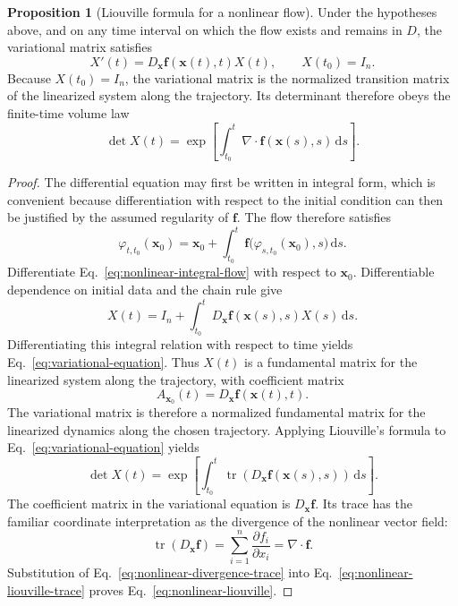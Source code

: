\documentclass[11pt,a4paper]{article}
\newcommand{\be}{\begin{equation}}
\newcommand{\ee}{\end{equation}}
\newcommand{\lb}[1]{\label{#1}}
\newcommand{\dd}{\mathrm{d}}
\DeclareMathOperator{\tr}{tr}
\theoremstyle{definition}
\newtheorem{proposition}{Proposition}[section]
\numberwithin{equation}{section}
\begin{document}
\begin{proposition}[Liouville formula for a nonlinear flow]
Under the hypotheses above, and on any time interval on which the flow exists and remains in $D$, the variational matrix satisfies
\be
X'(t)=D_{\mathbf x}\mathbf f(\mathbf x(t),t)X(t),
\qquad
X(t_0)=I_n.
\lb{eq:variational-equation}
\ee
Because $X(t_0)=I_n$, the variational matrix is the normalized transition matrix of the linearized system along the trajectory. Its determinant therefore obeys the finite-time volume law
\be
\det X(t)
=
\exp\left[
\int_{t_0}^{t}
\nabla\cdot\mathbf f(\mathbf x(s),s)\,\dd s
\right].
\lb{eq:nonlinear-liouville}
\ee
\end{proposition}

\begin{proof}
The differential equation may first be written in integral form, which is convenient because differentiation with respect to the initial condition can then be justified by the assumed regularity of $\mathbf f$. The flow therefore satisfies
\be
\varphi_{t,t_0}(\mathbf x_0)
=
\mathbf x_0
+
\int_{t_0}^{t}
\mathbf f\bigl(\varphi_{s,t_0}(\mathbf x_0),s\bigr)\,\dd s.
\lb{eq:nonlinear-integral-flow}
\ee
Differentiate Eq.~\eqref{eq:nonlinear-integral-flow} with respect to $\mathbf x_0$. Differentiable dependence on initial data and the chain rule give
\be
X(t)
=
I_n
+
\int_{t_0}^{t}
D_{\mathbf x}\mathbf f(\mathbf x(s),s)X(s)\,\dd s.
\lb{eq:variational-integral}
\ee
Differentiating this integral relation with respect to time yields Eq.~\eqref{eq:variational-equation}. Thus $X(t)$ is a fundamental matrix for the linearized system along the trajectory, with coefficient matrix
\be
A_{\mathbf x_0}(t)
=
D_{\mathbf x}\mathbf f(\mathbf x(t),t).
\lb{eq:nonlinear-linearized-generator}
\ee
The variational matrix is therefore a normalized fundamental matrix for the linearized dynamics along the chosen trajectory. Applying Liouville's formula to Eq.~\eqref{eq:variational-equation} yields
\be
\det X(t)
=
\exp\left[
\int_{t_0}^{t}
\tr\!\left(D_{\mathbf x}\mathbf f(\mathbf x(s),s)\right)\,\dd s
\right].
\lb{eq:nonlinear-liouville-trace}
\ee
The coefficient matrix in the variational equation is $D_{\mathbf x}\mathbf f$. Its trace has the familiar coordinate interpretation as the divergence of the nonlinear vector field:
\be
\tr\!\left(D_{\mathbf x}\mathbf f\right)
=
\sum_{i=1}^{n}\frac{\partial f_i}{\partial x_i}
=
\nabla\cdot\mathbf f.
\lb{eq:nonlinear-divergence-trace}
\ee
Substitution of Eq.~\eqref{eq:nonlinear-divergence-trace} into Eq.~\eqref{eq:nonlinear-liouville-trace} proves Eq.~\eqref{eq:nonlinear-liouville}.
\end{proof}
\end{document}
